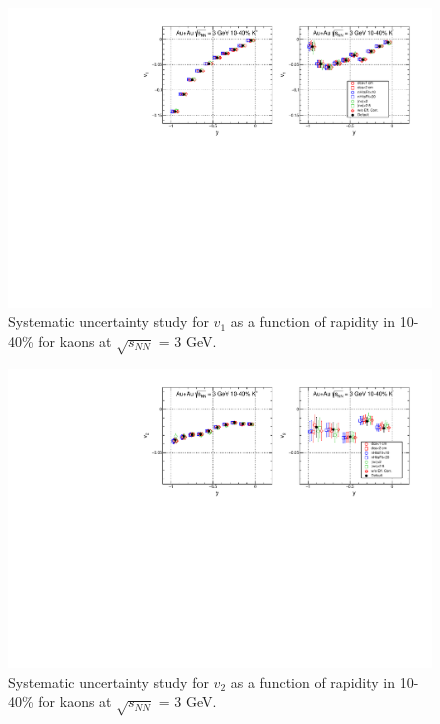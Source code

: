 \begin{figure}[h]
\includegraphics[scale=0.8]{FXT3gev/chapter3/fig/sys/kaon/v1y_kaon_sys.pdf}
\caption{Systematic uncertainty study for $v_{1}$ as a function of rapidity in 10-40\% for kaons at $\sqrt{s_{NN}}$ = 3 GeV.}
\label{fig:kaon_v1y_sys}
\end{figure}

\begin{figure}[h]
\includegraphics[scale=0.8]{FXT3gev/chapter3/fig/sys/kaon/v2y_kaon_sys.pdf}
\caption{Systematic uncertainty study for $v_{2}$ as a function of rapidity in 10-40\% for kaons at $\sqrt{s_{NN}}$ = 3 GeV.}
\label{fig:kaon_v2y_sys}
\end{figure}

